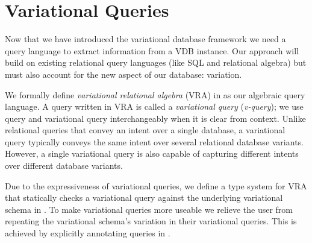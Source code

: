 \chapter{Variational Queries}
\label{ch:vql}


Now that we have introduced the variational database framework 
we need a query language to extract information from a VDB instance.
Our approach will build on existing relational query languages (like SQL and relational algebra)
but must also account for the new aspect of our database: variation. 


We formally define 
\emph{variational relational algebra} (VRA) in 
as our algebraic query language.
A query written in VRA is called a \emph{variational query} (\emph{v-query});
we use query and variational query interchangeably when it is clear from context. 
Unlike relational queries that convey an intent over a single database, 
a variational query typically conveys the same intent over several 
relational database variants. However, a single variational query is also capable of capturing different 
intents over different database variants.



%
Due to the expressiveness of variational queries, 
we define a type system for VRA that statically checks a
variational query against the underlying variational schema in .
%
To make variational queries more useable we relieve the user from repeating 
the variational schema's variation in their variational queries. This is achieved by 
explicitly annotating queries in .

